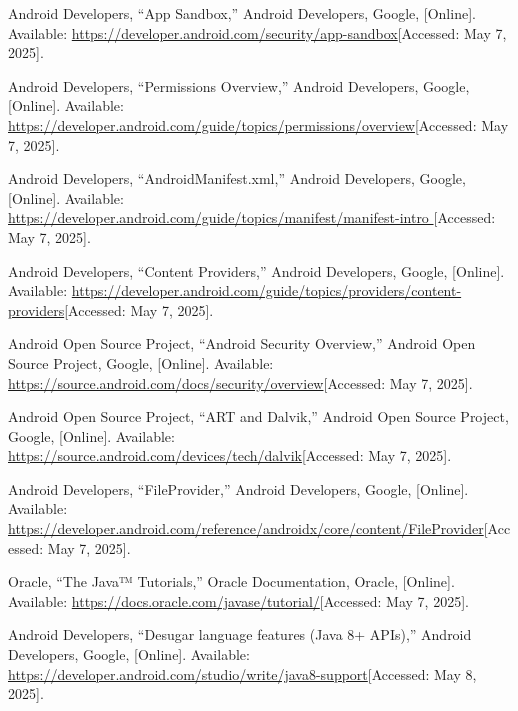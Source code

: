 \documentclass[12pt]{report}
\begin{document}
\begin{thebibliography}{1}
  Android Developers, “App Sandbox,” Android Developers, Google, [Online]. Available: \url{https://developer.android.com/security/app-sandbox}[Accessed: May 7, 2025].
  
  Android Developers, “Permissions Overview,” Android Developers, Google, [Online]. Available: \url{https://developer.android.com/guide/topics/permissions/overview}[Accessed: May 7, 2025].
  
  Android Developers, “AndroidManifest.xml,” Android Developers, Google, [Online]. Available: \url{https://developer.android.com/guide/topics/manifest/manifest-intro }[Accessed: May 7, 2025].
   
  Android Developers, “Content Providers,” Android Developers, Google, [Online]. Available: \url{https://developer.android.com/guide/topics/providers/content-providers}[Accessed: May 7, 2025].
  
  Android Open Source Project, “Android Security Overview,” Android Open Source Project, Google, [Online]. Available: \url{https://source.android.com/docs/security/overview}[Accessed: May 7, 2025].
 
  Android Open Source Project, “ART and Dalvik,” Android Open Source Project, Google, [Online]. Available: \url{https://source.android.com/devices/tech/dalvik}[Accessed: May 7, 2025].
 
  Android Developers, “FileProvider,” Android Developers, Google, [Online]. Available: \url{https://developer.android.com/reference/androidx/core/content/FileProvider}[Accessed: May 7, 2025].
 
  Oracle, “The Java™ Tutorials,” Oracle Documentation, Oracle, [Online]. Available: \url{https://docs.oracle.com/javase/tutorial/}[Accessed: May 7, 2025].
 
  Android Developers, “Desugar language features (Java 8+ APIs),” Android Developers, Google, [Online]. Available: \url{https://developer.android.com/studio/write/java8-support}[Accessed: May 8, 2025].
 
  

\end{thebibliography}
\end{document}
